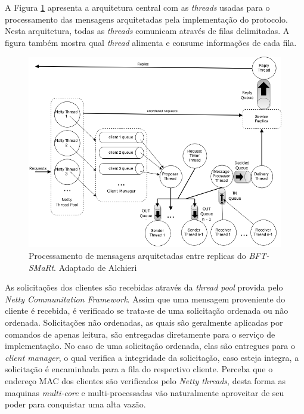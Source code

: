 	A Figura \ref{fig:image5} apresenta a arquitetura central com as \textit{threads}  usadas para o processamento das mensagens arquitetadas pela implementação do protocolo. Nesta arquitetura, todas as \textit{threads} comunicam através de filas delimitadas. A figura também mostra qual \textit{thread} alimenta e consume informações de cada fila. \\  
	
	\begin{figure}[htb]
		\begin{center}
			
			\includegraphics[clip,width=13.0cm]{images/image5.png}
			\caption{Processamento de mensagens arquitetadas entre replicas do \textit{BFT-SMaRt}. Adaptado de Alchieri~\cite{bessani3} }
			\label{fig:image5}
		\end{center}
	\end{figure}
	
	As solicitações dos clientes são recebidas através da \textit{thread pool} provida pelo \textit{Netty Communitation Framework}. Assim que uma mensagem proveniente do cliente é recebida, é verificado se trata-se de uma solicitação ordenada ou não ordenada. Solicitações não ordenadas, as quais são geralmente aplicadas por comandos de apenas leitura, são entregadas diretamente para o serviço de implementação. No caso de uma solicitação ordenada, elas são entregues para o \textit{client manager}, o qual verifica a integridade da solicitação, caso esteja integra, a solicitação é encaminhada para a fila do respectivo cliente. Perceba que o endereço MAC dos clientes são verificados pelo \textit{Netty threads}, desta forma as maquinas \textit{multi-core} e multi-processadas vão naturalmente aproveitar de seu poder para conquistar uma alta vazão. \\ 
	
